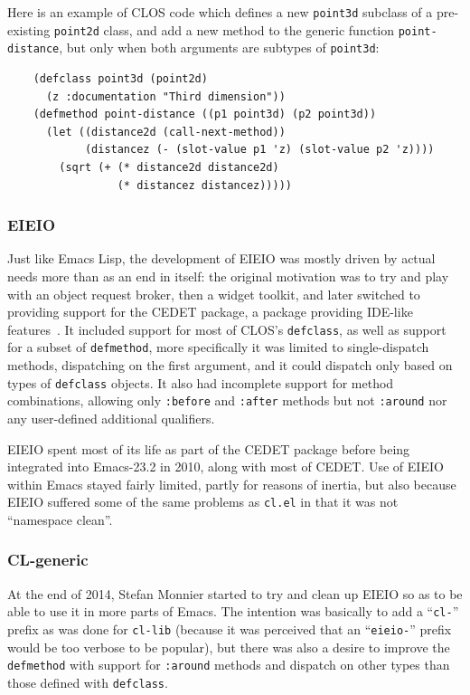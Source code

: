 \documentclass[format=acmsmall, review]{acmart}
\newcommand \Elisp {Emacs Lisp}
\begin{document}
Here is an example of CLOS code which defines a new \texttt{point3d} subclass
of a pre-existing \texttt{point2d} class, and add a new method to the
generic function \texttt{point-distance}, but only when both
arguments are subtypes of \texttt{point3d}:
\begin{verbatim}
    (defclass point3d (point2d)
      (z :documentation "Third dimension"))
    (defmethod point-distance ((p1 point3d) (p2 point3d))
      (let ((distance2d (call-next-method))
            (distancez (- (slot-value p1 'z) (slot-value p2 'z))))
        (sqrt (+ (* distance2d distance2d)
                 (* distancez distancez)))))
\end{verbatim}

\subsubsection{EIEIO}

Just like \Elisp{}, the development of EIEIO was mostly
driven by actual needs more than as an end in itself: the original
motivation was to try and play with an object request broker, then a widget
toolkit, and later switched to providing support for the CEDET
package, a package providing IDE-like features~\cite{Ludlam18}.
It included support for most of CLOS's \texttt{defclass}, as well as support
for a subset of \texttt{defmethod}, more specifically it was limited to
single-dispatch methods, dispatching on the first argument, and it could
dispatch only based on types of \texttt{defclass} objects.  It also had
incomplete support for method combinations, allowing only \texttt{:before}
and \texttt{:after} methods but not \texttt{:around} nor any user-defined
additional qualifiers.

EIEIO spent most of its life as part of the CEDET package
before being integrated into Emacs-23.2 in
2010, along with most of CEDET.  Use of EIEIO within Emacs stayed fairly
limited, partly for reasons of inertia, but also because EIEIO suffered some
of the same problems as \texttt{cl.el} in that it was not
``namespace clean''.

\subsubsection{CL-generic}

At the end of 2014, Stefan Monnier started to try and clean up EIEIO so as
to be able to use it in more parts of Emacs.  The intention was basically to
add a ``\texttt{cl-}'' prefix as was done for \texttt{cl-lib} (because it
was perceived that an ``\texttt{eieio-}'' prefix would be too verbose to be
popular), but there was also a desire to improve the \texttt{defmethod} with
support for \texttt{:around} methods and dispatch on other types than those
defined with \texttt{defclass}.
\end{document}
